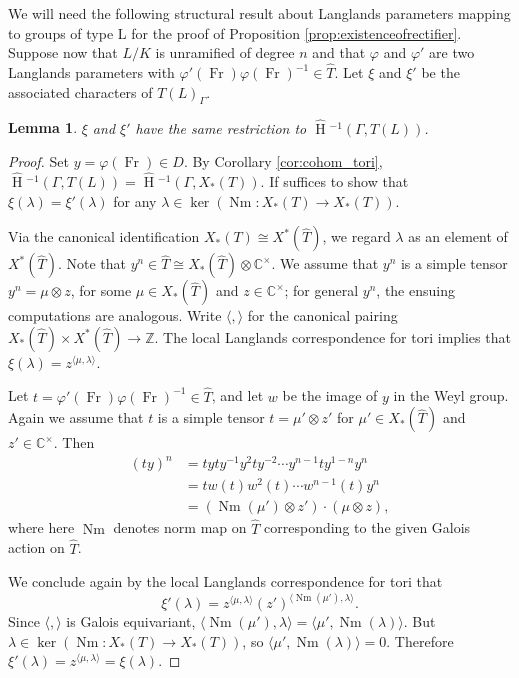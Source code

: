 \documentclass{mrlart7}
\theoremstyle{plain}
\newtheorem{lemma}[theorem]{Lemma}
\newcommand{\HT}[1]{\hat{\HH}{}^{#1}}
\theoremstyle{definition}
\numberwithin{equation}{section}
\DeclareMathOperator{\HH}{H}
\DeclareMathOperator{\Nm}{Nm}
\DeclareMathOperator{\Fr}{Fr}
\newcommand{\CC}{\mathbb{C}}
\newcommand{\ZZ}{\mathbb{Z}}
\begin{document}
We will need the following structural result about Langlands
parameters mapping to groups of type L for the proof of
Proposition \ref{prop:existenceofrectifier}.  Suppose now that $L/K$ is unramified of degree $n$ and that
$\varphi$ and $\varphi'$ are two Langlands parameters
with $\varphi'(\Fr) \varphi(\Fr)^{-1} \in \hat{T}$.
Let $\xi$ and $\xi'$ be the associated characters of $T(L)_{\Gamma}$.

\begin{lemma} \label{lem:toral_modification}
$\xi$ and $\xi'$ have the same restriction to $\HT{-1}(\Gamma, T(L))$.
\end{lemma}

\begin{proof}
Set $y = \varphi(\Fr) \in D$.  By Corollary \ref{cor:cohom_tori},
$\HT{-1}(\Gamma, T(L)) = \HT{-1}(\Gamma, X_*(T))$.
If suffices to show that $\xi(\lambda) = \xi'(\lambda)$ for any $\lambda \in \ker(\Nm : X_*(T) \rightarrow X_*(T))$.

Via the canonical identification $X_*(T) \cong X^*(\hat{T})$,
we regard $\lambda$ as an element of $X^*(\hat{T})$.  Note that $y^n \in \hat{T} \cong X_*(\hat{T}) \otimes \CC^\times$. We assume that $y^n$ is a simple tensor $y^n = \mu \otimes z$, for some $\mu \in X_*(\hat{T})$ and
$z \in \CC^{\times}$; for general $y^n$, the ensuing computations are analogous.  Write $\langle , \rangle$ for the canonical pairing $X_*(\hat{T}) \times X^*(\hat{T}) \to \ZZ$.  The local Langlands
correspondence for tori implies that $\xi(\lambda) = z^{\langle \mu, \lambda \rangle}$.

Let $t = \varphi'(\Fr)\varphi(\Fr)^{-1} \in \hat{T}$, and let $w$ be the image of $y$ in the Weyl group. Again we assume that $t$ is a simple tensor $t = \mu' \otimes z'$ for $\mu' \in X_*(\hat{T})$
and $z' \in \mathbb{C}^{\times}$.  Then
\begin{align*}
(ty)^n &= t yty^{-1} y^2 t y^{-2} \cdots y^{n-1} t y^{1-n} y^n \\
&= t w(t) w^2(t) \cdots w^{n-1}(t) y^n \\
&=(\Nm(\mu' ) \otimes z') \cdot (\mu \otimes z),
\end{align*}
where here $\Nm$ denotes norm map on $\hat{T}$ corresponding to the given Galois action on $\hat{T}$.

We conclude again by the local Langlands correspondence for tori that
\[
\xi'(\lambda) = z^{\langle \mu, \lambda \rangle} (z' )^{\langle \Nm(\mu'), \lambda \rangle}.
\]
Since $\langle , \rangle$ is Galois equivariant, $\langle \Nm(\mu'), \lambda \rangle = \langle\mu', \Nm(\lambda)\rangle$.
But $\lambda \in \ker(\Nm : X_*(T) \rightarrow X_*(T))$, so $\langle\mu', \Nm(\lambda)\rangle = 0$.
Therefore $\xi'(\lambda) = z^{\langle\mu, \lambda\rangle} = \xi(\lambda)$.
\end{proof}
\end{document}
